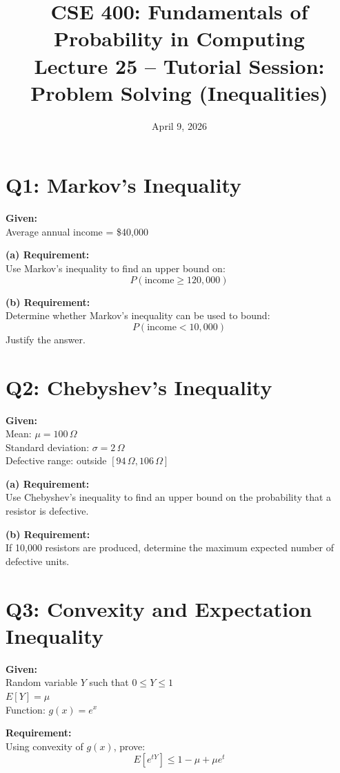 \documentclass[12pt]{article}
\title{CSE 400: Fundamentals of Probability in Computing \\ 
Lecture 25 -- Tutorial Session: Problem Solving (Inequalities)}
\date{April 9, 2026}
\begin{document}
\maketitle

\section*{Q1: Markov’s Inequality}

\textbf{Given:} \\
Average annual income = \$40,000

\textbf{(a) Requirement:} \\
Use Markov’s inequality to find an upper bound on:
\[
P(\text{income} \geq 120{,}000)
\]

\textbf{(b) Requirement:} \\
Determine whether Markov’s inequality can be used to bound:
\[
P(\text{income} < 10{,}000)
\]
Justify the answer.

\section*{Q2: Chebyshev’s Inequality}

\textbf{Given:} \\
Mean: $\mu = 100\,\Omega$ \\
Standard deviation: $\sigma = 2\,\Omega$ \\
Defective range: outside $[94\,\Omega, 106\,\Omega]$

\textbf{(a) Requirement:} \\
Use Chebyshev’s inequality to find an upper bound on the probability that a resistor is defective.

\textbf{(b) Requirement:} \\
If 10,000 resistors are produced, determine the maximum expected number of defective units.

\section*{Q3: Convexity and Expectation Inequality}

\textbf{Given:} \\
Random variable $Y$ such that $0 \leq Y \leq 1$ \\
$E[Y] = \mu$ \\
Function: $g(x) = e^x$

\textbf{Requirement:} \\
Using convexity of $g(x)$, prove:
\[
E[e^{tY}] \leq 1 - \mu + \mu e^t
\]
\end{document}
